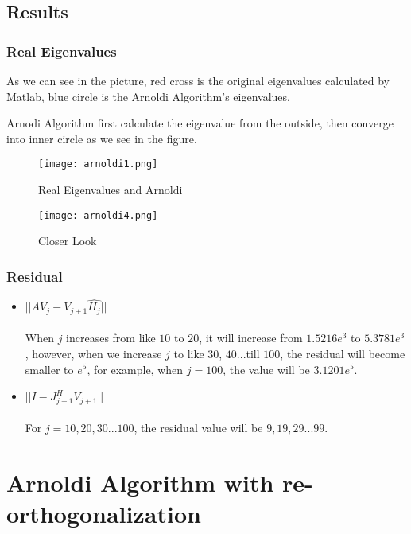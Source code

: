 \documentclass{article}
\begin{document}
\subsection{Results}
\subsubsection{Real Eigenvalues}
\begin{flushleft}
As we can see in the picture, red cross is the original eigenvalues calculated by Matlab, blue circle is the Arnoldi Algorithm's eigenvalues.

Arnodi Algorithm first calculate the eigenvalue from the outside, then converge into inner circle as we see in the figure.
\end{flushleft}
\begin{figure}[H]
    \centering
    \texttt{[image: arnoldi1.png]}
    \caption{Real Eigenvalues and Arnoldi}
    \texttt{[image: arnoldi4.png]}
    \caption{Closer Look}
    \label{fig:arnoldi}
\end{figure}
\subsubsection{Residual}
\begin{itemize}
    \item $||AV_j-V_{j+1}\hat{H_j}||$\\
    \\
    When $j$ increases from like $10$ to $20$, it will increase from  $1.5216e^3$ to $5.3781e^3$, however, when we increase $j$ to like $30$, $40$...till $100$, the residual will become smaller to $e^5$, for example, when $j=100$, the value will be $3.1201e^5$.
    \item $||I-J^H_{j+1}V_{j+1}||$\\
    \\
    For $j=10,20,30...100$, the residual value will be $9,19,29...99$.
\end{itemize}
\section{Arnoldi Algorithm with re-orthogonalization}
\end{document}
